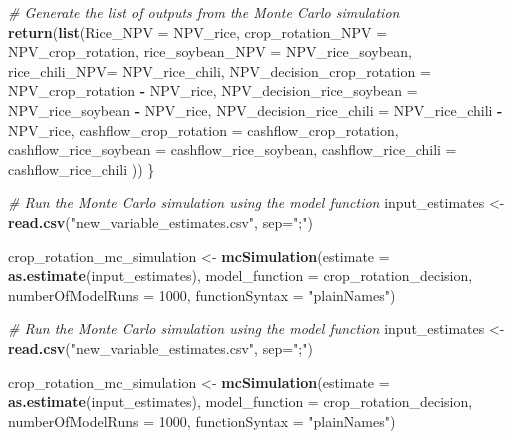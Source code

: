 \documentclass[
]{article}
\newenvironment{Shaded}{\begin{snugshade}}{\end{snugshade}}
\newcommand{\AttributeTok}[1]{\textcolor[rgb]{0.13,0.29,0.53}{#1}}
\newcommand{\CommentTok}[1]{\textcolor[rgb]{0.56,0.35,0.01}{\textit{#1}}}
\newcommand{\DecValTok}[1]{\textcolor[rgb]{0.00,0.00,0.81}{#1}}
\newcommand{\FunctionTok}[1]{\textcolor[rgb]{0.13,0.29,0.53}{\textbf{#1}}}
\newcommand{\NormalTok}[1]{#1}
\newcommand{\OtherTok}[1]{\textcolor[rgb]{0.56,0.35,0.01}{#1}}
\newcommand{\SpecialCharTok}[1]{\textcolor[rgb]{0.81,0.36,0.00}{\textbf{#1}}}
\newcommand{\StringTok}[1]{\textcolor[rgb]{0.31,0.60,0.02}{#1}}
\begin{document}
\begin{Shaded}
\begin{Highlighting}[]
  
  \CommentTok{\# Generate the list of outputs from the Monte Carlo simulation}
  \FunctionTok{return}\NormalTok{(}\FunctionTok{list}\NormalTok{(}\AttributeTok{Rice\_NPV =}\NormalTok{ NPV\_rice,}
              \AttributeTok{crop\_rotation\_NPV =}\NormalTok{ NPV\_crop\_rotation,}
              \AttributeTok{rice\_soybean\_NPV =}\NormalTok{ NPV\_rice\_soybean,}
              \AttributeTok{rice\_chili\_NPV=}\NormalTok{ NPV\_rice\_chili,}
              \AttributeTok{NPV\_decision\_crop\_rotation =}\NormalTok{ NPV\_crop\_rotation }\SpecialCharTok{{-}}\NormalTok{ NPV\_rice,}
              \AttributeTok{NPV\_decision\_rice\_soybean =}\NormalTok{ NPV\_rice\_soybean }\SpecialCharTok{{-}}\NormalTok{ NPV\_rice,}
              \AttributeTok{NPV\_decision\_rice\_chili =}\NormalTok{ NPV\_rice\_chili }\SpecialCharTok{{-}}\NormalTok{ NPV\_rice,}
              \AttributeTok{cashflow\_crop\_rotation =}\NormalTok{ cashflow\_crop\_rotation,}
              \AttributeTok{cashflow\_rice\_soybean =}\NormalTok{ cashflow\_rice\_soybean,}
              \AttributeTok{cashflow\_rice\_chili =}\NormalTok{ cashflow\_rice\_chili}
\NormalTok{  ))}
\NormalTok{\}}

\CommentTok{\# Run the Monte Carlo simulation using the model function}
\NormalTok{input\_estimates }\OtherTok{\textless{}{-}} \FunctionTok{read.csv}\NormalTok{(}\StringTok{"new\_variable\_estimates.csv"}\NormalTok{, }\AttributeTok{sep=}\StringTok{";"}\NormalTok{)}

\NormalTok{crop\_rotation\_mc\_simulation }\OtherTok{\textless{}{-}} \FunctionTok{mcSimulation}\NormalTok{(}\AttributeTok{estimate =} \FunctionTok{as.estimate}\NormalTok{(input\_estimates),}
                                            \AttributeTok{model\_function =}\NormalTok{ crop\_rotation\_decision,}
                                            \AttributeTok{numberOfModelRuns =} \DecValTok{1000}\NormalTok{,}
                                            \AttributeTok{functionSyntax =} \StringTok{"plainNames"}\NormalTok{)}

\CommentTok{\# Run the Monte Carlo simulation using the model function}
\NormalTok{input\_estimates }\OtherTok{\textless{}{-}} \FunctionTok{read.csv}\NormalTok{(}\StringTok{"new\_variable\_estimates.csv"}\NormalTok{, }\AttributeTok{sep=}\StringTok{";"}\NormalTok{)}

\NormalTok{crop\_rotation\_mc\_simulation }\OtherTok{\textless{}{-}} \FunctionTok{mcSimulation}\NormalTok{(}\AttributeTok{estimate =} \FunctionTok{as.estimate}\NormalTok{(input\_estimates),}
                                            \AttributeTok{model\_function =}\NormalTok{ crop\_rotation\_decision,}
                                            \AttributeTok{numberOfModelRuns =} \DecValTok{1000}\NormalTok{,}
                                            \AttributeTok{functionSyntax =} \StringTok{"plainNames"}\NormalTok{)}
\end{Highlighting}
\end{Shaded}
\end{document}
